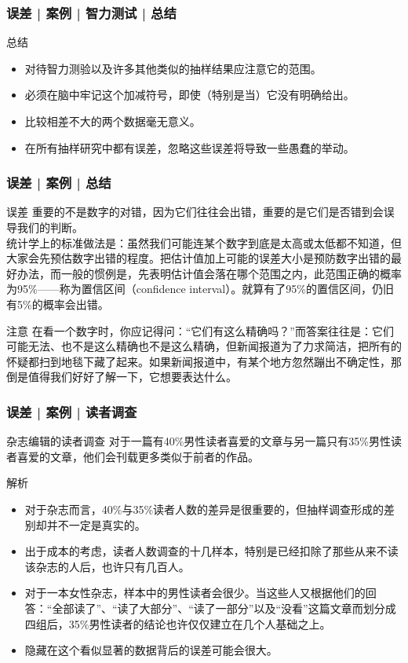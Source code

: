 \begin{frame}
  \frametitle{误差 | 案例 | 智力测试 | 总结}
  \begin{block}{总结}
    \begin{itemize}
      \item 对待智力测验以及许多其他类似的抽样结果应注意它的范围。
      \item 必须在脑中牢记这个加减符号，即使（特别是当）它没有明确给出。
      \item 比较相差不大的两个数据毫无意义。
      \item 在所有抽样研究中都有误差，忽略这些误差将导致一些愚蠢的举动。
    \end{itemize}
  \end{block}
\end{frame}

\begin{frame}
  \frametitle{误差 | 案例 | 总结}
  \begin{block}{误差}
    重要的不是数字的对错，因为它们往往会出错，重要的是它们是否错到会误导我们的判断。\\
    \vspace{0.3em}
统计学上的标准做法是：虽然我们可能连某个数字到底是太高或太低都不知道，但大家会先预估数字出错的程度。把估计值加上可能的误差大小是预防数字出错的最好办法，而一般的惯例是，先表明估计值会落在哪个范围之内，此范围正确的概率为95\%——称为置信区间（confidence interval）。就算有了95\%的置信区间，仍旧有5\%的概率会出错。
  \end{block}
  \pause
  \begin{block}{注意}
在看一个数字时，你应记得问：“它们有这么精确吗？”而答案往往是：它们可能无法、也不是这么精确也不是这么精确，但新闻报道为了力求简洁，把所有的怀疑都扫到地毯下藏了起来。如果新闻报道中，有某个地方忽然蹦出不确定性，那倒是值得我们好好了解一下，它想要表达什么。
  \end{block}
\end{frame}

\begin{frame}
  \frametitle{误差 | 案例 | 读者调查}
  \begin{block}{杂志编辑的读者调查}
    对于一篇有40\%男性读者喜爱的文章与另一篇只有35\%男性读者喜爱的文章，他们会刊载更多类似于前者的作品。
  \end{block}
  \pause
  \begin{block}{解析}
    \begin{itemize}
      \item 对于杂志而言，40\%与35\%读者人数的差异是很重要的，但抽样调查形成的差别却并不一定是真实的。
      \item 出于成本的考虑，读者人数调查的十几样本，特别是已经扣除了那些从来不读该杂志的人后，也许只有几百人。
      \item 对于一本女性杂志，样本中的男性读者会很少。当这些人又根据他们的回答：“全部读了”、“读了大部分”、“读了一部分”以及“没看”这篇文章而划分成四组后，35\%男性读者的结论也许仅仅建立在几个人基础之上。
      \item 隐藏在这个看似显著的数据背后的误差可能会很大。
    \end{itemize}
  \end{block}
\end{frame}

